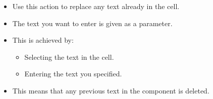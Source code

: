 
\begin{itemize}
\item Use this action to replace any text already in the cell.
\item The text you want to enter is given as a parameter.
\item This is achieved by:
\begin{itemize}
\item Selecting the text in the cell.
\item Entering the text you specified.
\end{itemize}
\item This means that any previous text in the component is deleted. 
\end{itemize}


